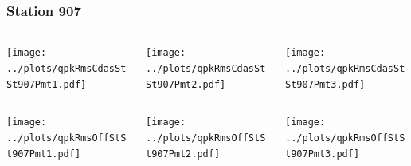\documentclass[aspectratio=169]{beamer}
\begin{document}
\begin{frame} 
  \frametitle{Station 907}
  \begin{center}
    \begin{columns}
      \begin{column}{0.33\textwidth}
        \texttt{[image: ../plots/qpkRmsCdasStSt907Pmt1.pdf]}
      \end{column}
      \begin{column}{0.33\textwidth}
        \texttt{[image: ../plots/qpkRmsCdasStSt907Pmt2.pdf]}
      \end{column}
      \begin{column}{0.33\textwidth}
        \texttt{[image: ../plots/qpkRmsCdasStSt907Pmt3.pdf]}
      \end{column}
    \end{columns}
  \end{center}

  \begin{center}
    \begin{columns}
      \begin{column}{0.33\textwidth}
        \texttt{[image: ../plots/qpkRmsOffStSt907Pmt1.pdf]}
      \end{column}
      \begin{column}{0.33\textwidth}
        \texttt{[image: ../plots/qpkRmsOffStSt907Pmt2.pdf]}
      \end{column}
      \begin{column}{0.33\textwidth}
        \texttt{[image: ../plots/qpkRmsOffStSt907Pmt3.pdf]}
      \end{column}
    \end{columns}
  \end{center}
\end{frame}
\end{document}
